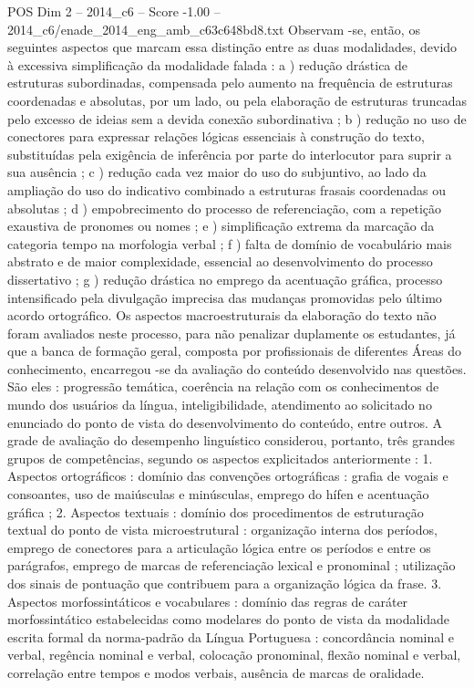 \begin{textsample}{POS Dim 2 – 2014\_c6 – Score -1.00 – 2014\_c6/enade\_2014\_eng\_amb\_c63c648bd8.txt}
Observam -se, então, os seguintes aspectos que marcam essa distinção entre as duas modalidades, devido à excessiva simplificação da modalidade falada : a ) redução drástica de estruturas subordinadas, compensada pelo aumento na frequência de estruturas coordenadas e absolutas, por um lado, ou pela elaboração de estruturas truncadas pelo excesso de ideias sem a devida conexão subordinativa ; b ) redução no uso de conectores para expressar relações lógicas essenciais à construção do texto, substituídas pela exigência de inferência por parte do interlocutor para suprir a sua ausência ; c ) redução cada vez maior do uso do subjuntivo, ao lado da ampliação do uso do indicativo combinado a estruturas frasais coordenadas ou absolutas ; d ) empobrecimento do processo de referenciação, com a repetição exaustiva de pronomes ou nomes ; e ) simplificação extrema da marcação da categoria tempo na morfologia verbal ; f ) falta de domínio de vocabulário mais abstrato e de maior complexidade, essencial ao desenvolvimento do processo dissertativo ; g ) redução drástica no emprego da acentuação gráfica, processo intensificado pela divulgação imprecisa das mudanças promovidas pelo último acordo ortográfico.
Os aspectos macroestruturais da elaboração do texto não foram avaliados neste processo, para não penalizar duplamente os estudantes, já que a banca de formação geral, composta por profissionais de diferentes Áreas do conhecimento, encarregou -se da avaliação do conteúdo desenvolvido nas questões.
São eles : progressão temática, coerência na relação com os conhecimentos de mundo dos usuários da língua, inteligibilidade, atendimento ao solicitado no enunciado do ponto de vista do desenvolvimento do conteúdo, entre outros.
A grade de avaliação do desempenho linguístico considerou, portanto, três grandes grupos de competências, segundo os aspectos explicitados anteriormente : 1.
Aspectos ortográficos : domínio das convenções ortográficas : grafia de vogais e consoantes, uso de maiúsculas e minúsculas, emprego do hífen e acentuação gráfica ; 2.
Aspectos textuais : domínio dos procedimentos de estruturação textual do ponto de vista microestrutural : organização interna dos períodos, emprego de conectores para a articulação lógica entre os períodos e entre os parágrafos, emprego de marcas de referenciação lexical e pronominal ; utilização dos sinais de pontuação que contribuem para a organização lógica da frase. 3.
Aspectos morfossintáticos e vocabulares : domínio das regras de caráter morfossintático estabelecidas como modelares do ponto de vista da modalidade escrita formal da norma-padrão da Língua Portuguesa : concordância nominal e verbal, regência nominal e verbal, colocação pronominal, flexão nominal e verbal, correlação entre tempos e modos verbais, ausência de marcas de oralidade.

\end{textsample}
